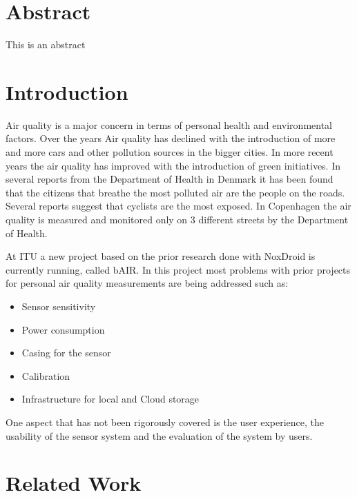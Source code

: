 \documentclass{ituthesis}
\begin{document}

\frontmatter

\thetitlepage
\newpage

\chapter*{Abstract}
This is an abstract

\cleardoublepage
\setcounter{tocdepth}{1}
\tableofcontents

\mainmatter

\midsloppy
\sloppybottom

\chapter{Introduction}
\label{ch:introduction}

Air quality is a major concern in terms of personal health and environmental factors. Over the years Air quality has declined with the introduction of more and more cars and other pollution sources in the bigger cities. In more recent years the air quality has improved with the introduction of green initiatives. In several reports from the Department of Health in Denmark it has been found that the citizens that breathe the most polluted air are the people on the roads. Several reports suggest that cyclists are the most exposed. In Copenhagen the air quality is measured and monitored only on 3 different streets by the Department of Health. 

At ITU a new project based on the prior research done with NoxDroid is currently running, called bAIR. In this project most problems with prior projects for personal air quality measurements are being addressed such as: 

\begin{itemize}
\item Sensor sensitivity 
\item Power consumption 
\item Casing for the sensor 
\item Calibration 
\item Infrastructure for local and Cloud storage 
\end{itemize}

One aspect that has not been rigorously covered is the user experience, the usability of the sensor system and the evaluation of the system by users.

\chapter{Related Work}
\label{ch:related_work}
\end{document}
